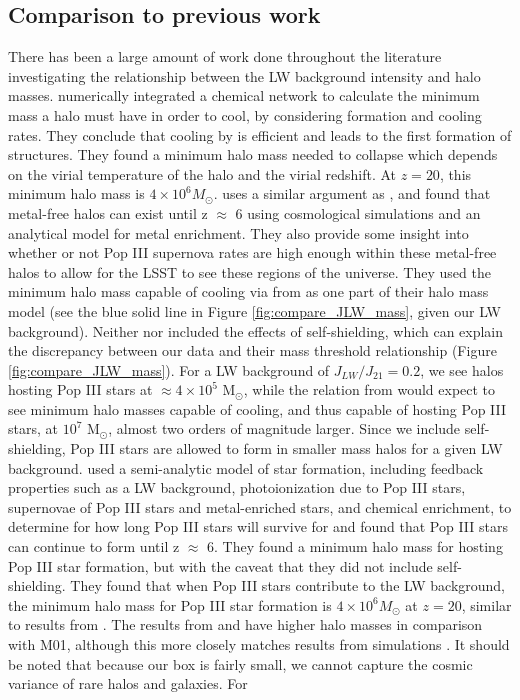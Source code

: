 \documentclass[a4paper,fleqn,usenatbib]{mnras}
\begin{document}
\subsection{Comparison to previous work}

There has been a large amount of work done throughout the literature investigating the relationship between the LW background intensity and halo masses. \citet{Tegmark97} numerically integrated a chemical network to calculate the minimum mass a halo must have in order to cool, by considering \hh{} formation and cooling rates. They conclude that cooling by \hh{} is efficient and leads to the first formation of structures. They found a minimum halo mass needed to collapse which depends on the virial temperature of the halo and the virial redshift. At $z = 20$, this minimum halo mass is $4 \times 10^{6} M_{\odot}$. \citet{Trenti09} uses a similar argument as \citet{Tegmark97}, and found that metal-free halos can exist until z $\approx$ 6 using cosmological simulations and an analytical model for metal enrichment. They also provide some insight into whether or not Pop III supernova rates are high enough within these metal-free halos to allow for the LSST to see these regions of the universe. They used the minimum halo mass capable of cooling via \hh{} from \citet{Trenti09_SFR} as one part of their halo mass model (see the blue solid line in Figure \ref{fig:compare_JLW_mass}, given our LW background). Neither \citet{Trenti09} nor \citet{Tegmark97} included the effects of \hh{} self-shielding, which can explain the discrepancy between our data and their mass threshold relationship (Figure \ref{fig:compare_JLW_mass}). For a LW background of $J_{LW} / J_{21} = 0.2$, we see halos hosting Pop III stars at $\approx 4 \times 10^{5}$ M$_{\odot}$, while the relation from \citet{Trenti09_SFR} would expect to see minimum halo masses capable of cooling, and thus capable of hosting Pop III stars, at $10^7$ M$_{\odot}$, almost two orders of magnitude larger. Since we include \hh{} self-shielding, Pop III stars are allowed to form in smaller mass halos for a given LW background. \citet{Mebane18} used a semi-analytic model of star formation, including feedback properties such as a LW background, photoionization due to Pop III stars, supernovae of Pop III stars and metal-enriched stars, and chemical enrichment, to determine for how long Pop III stars will survive for and found that Pop III stars can continue to form until z $\approx$ 6. They found a minimum halo mass for hosting Pop III star formation, but with the caveat that they did not include \hh{} self-shielding. They found that when Pop III stars contribute to the LW background, the minimum halo mass for Pop III star formation is $4 \times 10^{6} M_{\odot}$ at $z = 20$, similar to results from \citet{Tegmark97}. The results from \citet{Trenti09} and \citet{Mebane18} have higher halo masses in comparison with M01, although this more closely matches results from simulations \citep[see][]{Wise07_UVB, OShea08}. It should be noted that because our box is fairly small, we cannot capture the cosmic variance of rare halos and galaxies. For 
\end{document}

